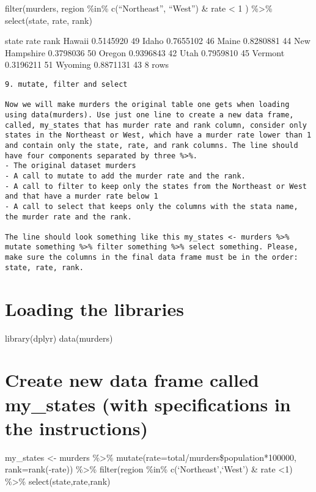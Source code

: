 \documentclass[
]{article}
\begin{document}
filter(murders, region \%in\% c(``Northeast'', ``West'') \& rate
\textless{} 1 ) \%\textgreater\% select(state, rate, rank)

state rate rank Hawaii 0.5145920 49 Idaho 0.7655102 46 Maine 0.8280881
44 New Hampshire 0.3798036 50 Oregon 0.9396843 42 Utah 0.7959810 45
Vermont 0.3196211 51 Wyoming 0.8871131 43 8 rows

\begin{verbatim}
9. mutate, filter and select

Now we will make murders the original table one gets when loading using data(murders). Use just one line to create a new data frame, called, my_states that has murder rate and rank column, consider only states in the Northeast or West, which have a murder rate lower than 1 and contain only the state, rate, and rank columns. The line should have four components separated by three %>%.
- The original dataset murders
- A call to mutate to add the murder rate and the rank.
- A call to filter to keep only the states from the Northeast or West and that have a murder rate below 1
- A call to select that keeps only the columns with the stata name, the murder rate and the rank.

The line should look something like this my_states <- murders %>% mutate something %>% filter something %>% select something. Please, make sure the columns in the final data frame must be in the order: state, rate, rank.
\end{verbatim}

\hypertarget{loading-the-libraries}{%
\section{Loading the libraries}\label{loading-the-libraries}}

library(dplyr) data(murders)

\hypertarget{create-new-data-frame-called-my_states-with-specifications-in-the-instructions}{%
\section{Create new data frame called my\_states (with specifications in
the
instructions)}\label{create-new-data-frame-called-my_states-with-specifications-in-the-instructions}}

my\_states \textless- murders \%\textgreater\%
mutate(rate=total/murders\$population*100000, rank=rank(-rate))
\%\textgreater\% filter(region \%in\% c(`Northeast',`West') \& rate
\textless1) \%\textgreater\% select(state,rate,rank)
\end{document}
